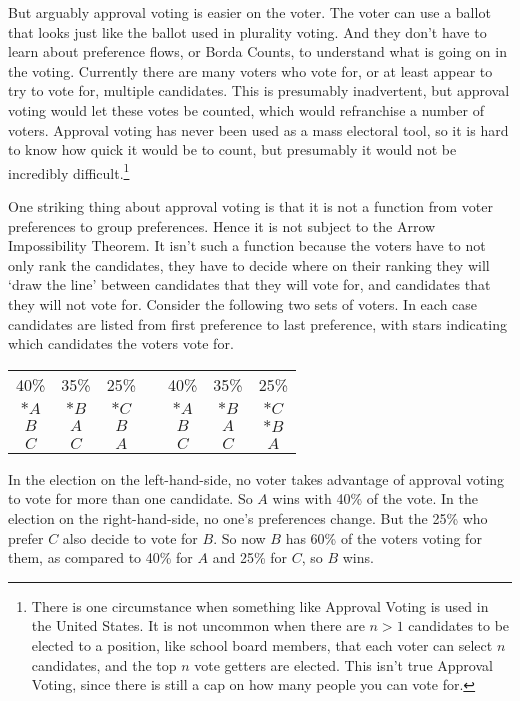 \begin{multicols}{2}
But arguably approval voting is easier on the voter. The voter can use a ballot that looks just like the ballot used in plurality voting. And they don't have to learn about preference flows, or Borda Counts, to understand what is going on in the voting. Currently there are many voters who vote for, or at least appear to try to vote for, multiple candidates. This is presumably inadvertent, but approval voting would let these votes be counted, which would refranchise a number of voters. Approval voting has never been used as a mass electoral tool, so it is hard to know how quick it would be to count, but presumably it would not be incredibly difficult.\footnote{There is one circumstance when something like Approval Voting is used in the United States. It is not uncommon when there are $n > 1$ candidates to be elected to a position, like school board members, that each voter can select $n$ candidates, and the top $n$ vote getters are elected. This isn't true Approval Voting, since there is still a cap on how many people you can vote for.}

One striking thing about approval voting is that it is not a function from voter preferences to group preferences. Hence it is not subject to the Arrow Impossibility Theorem. It isn't such a function because the voters have to not only rank the candidates, they have to decide where on their ranking they will `draw the line' between candidates that they will vote for, and candidates that they will not vote for. Consider the following two sets of voters. In each case candidates are listed from first preference to last preference, with stars indicating which candidates the voters vote for.


\begin{center}
\begin{tabular}{c c c p{100pt} c c c}
40\% & 35\% & 25\% & & 40\% & 35\% & 25\% \\
\cmidrule(r){1-3}
\cmidrule(r){5-7}
$*A$ & $*B$ & $*C$ & & $*A$ & $*B$ & $*C$ \\
$B$ & $A$ & $B$ & & $B$ & $A$ & $*B$ \\
$C$ & $C$ & $A$ & & $C$ & $C$ & $A$
\end{tabular}
\end{center}
In the election on the left-hand-side, no voter takes advantage of approval voting to vote for more than one candidate. So $A$ wins with 40\% of the vote. In the election on the right-hand-side, no one's preferences change. But the 25\% who prefer $C$ also decide to vote for $B$. So now $B$ has 60\% of the voters voting for them, as compared to 40\% for $A$ and 25\% for $C$, so $B$ wins.


\end{multicols}
